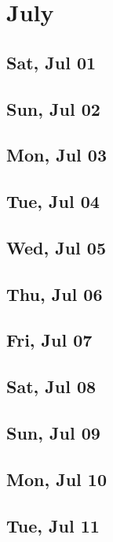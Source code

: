 \chapter{July}
	\section{Sat, Jul 01}
		
	\section{Sun, Jul 02}
		
	\section{Mon, Jul 03}
		
	\section{Tue, Jul 04}
		
	\section{Wed, Jul 05}
		
	\section{Thu, Jul 06}
		
	\section{Fri, Jul 07}
		
	\section{Sat, Jul 08}
		
	\section{Sun, Jul 09}
		
	\section{Mon, Jul 10}
		
	\section{Tue, Jul 11}
		
